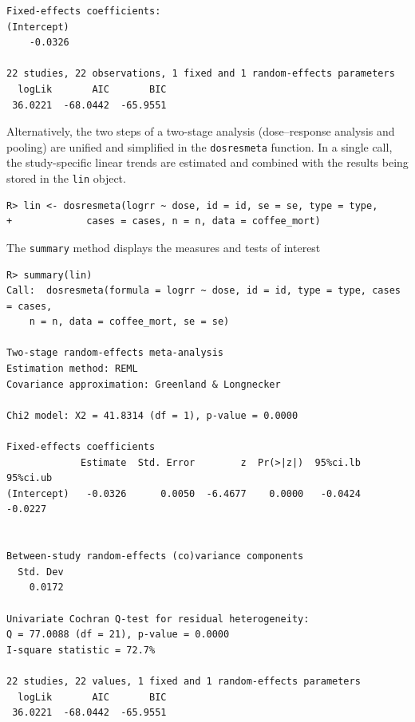 \documentclass[11pt,a4paper,twoside,openany]{book}\usepackage{knitr}
\begin{document}
{\begin{knitrout}
\begin{kframe}
\begin{verbatim}
Fixed-effects coefficients:
(Intercept)  
    -0.0326  

22 studies, 22 observations, 1 fixed and 1 random-effects parameters
  logLik       AIC       BIC  
 36.0221  -68.0442  -65.9551  
\end{verbatim}
\end{kframe}
\end{knitrout}

\noindent Alternatively, the two steps of a two-stage analysis (dose--response analysis and pooling) are unified and simplified in the \texttt{dosresmeta} function. In a single call, the study-specific linear trends are estimated and combined with the results being stored in the \texttt{lin} object. 
\begin{knitrout}\footnotesize
{}\color{fgcolor}\begin{kframe}
\begin{verbatim}
R> lin <- dosresmeta(logrr ~ dose, id = id, se = se, type = type,
+             cases = cases, n = n, data = coffee_mort)
\end{verbatim}
\end{kframe}
\end{knitrout}

\noindent The \texttt{summary} method displays the measures and tests of interest
\begin{knitrout}\footnotesize
{}\color{fgcolor}\begin{kframe}
\begin{verbatim}
R> summary(lin)
Call:  dosresmeta(formula = logrr ~ dose, id = id, type = type, cases = cases, 
    n = n, data = coffee_mort, se = se)

Two-stage random-effects meta-analysis
Estimation method: REML
Covariance approximation: Greenland & Longnecker

Chi2 model: X2 = 41.8314 (df = 1), p-value = 0.0000

Fixed-effects coefficients
             Estimate  Std. Error        z  Pr(>|z|)  95%ci.lb  95%ci.ub
(Intercept)   -0.0326      0.0050  -6.4677    0.0000   -0.0424   -0.0227


Between-study random-effects (co)variance components
  Std. Dev
    0.0172

Univariate Cochran Q-test for residual heterogeneity:
Q = 77.0088 (df = 21), p-value = 0.0000
I-square statistic = 72.7%

22 studies, 22 values, 1 fixed and 1 random-effects parameters
  logLik       AIC       BIC  
 36.0221  -68.0442  -65.9551  
\end{verbatim}
\end{kframe}
\end{knitrout}

}
\end{document}
